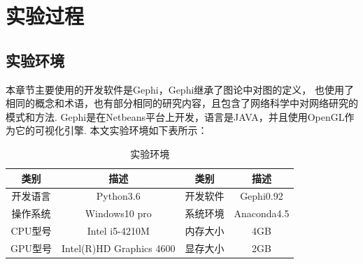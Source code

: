 \documentclass[bachelor,adobefonts]{jnuthesis}
\begin{document}
\section{实验过程}
\subsection{实验环境}
本章节主要使用的开发软件是Gephi，Gephi继承了图论中对图的定义，
也使用了相同的概念和术语，也有部分相同的研究内容，且包含了网络科学中对网络研究的模式和方法.
Gephi是在Netbeans平台上开发，语言是JAVA，并且使用OpenGL作为它的可视化引擎.
本文实验环境如下表所示：
\begin{table}[h!]
  \centering\begin{tabular}{cccc}
    \toprule
    \textbf{类别} & \textbf{描述} & \textbf{类别}  & \textbf{描述}\\
    \midrule
    开发语言  &  Python3.6                &  开发软件  &  Gephi0.92 \\
    操作系统  &  Windows10 pro            &  系统环境  &  Anaconda4.5 \\
    CPU型号   &  Intel i5-4210M           &  内存大小  & 4GB \\
    GPU型号   & Intel(R)HD Graphics 4600  &  显存大小  & 2GB \\   
    \bottomrule
  \end{tabular}
  \caption{实验环境}
\end{table}
\end{document}
